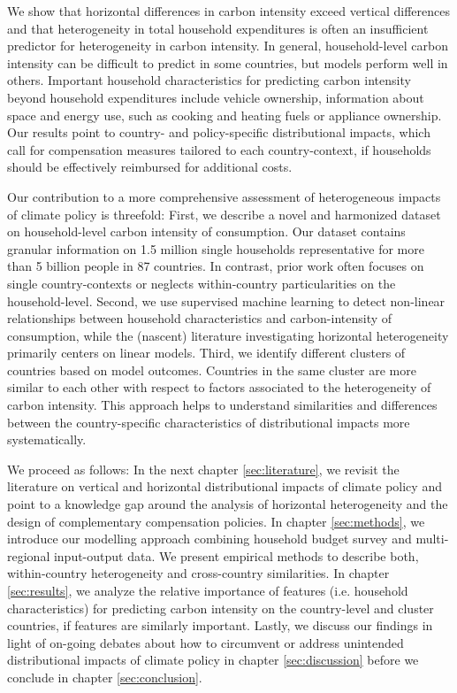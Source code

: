 \documentclass[12pt, a4paper]{article}
\begin{document}
We show that horizontal differences in carbon intensity exceed vertical differences and that heterogeneity in total household expenditures is often an insufficient predictor for heterogeneity in carbon intensity. In general, household-level carbon intensity can be difficult to predict in some countries, but models perform well in others. Important household characteristics for predicting carbon intensity beyond household expenditures include vehicle ownership, information about space and energy use, such as cooking and heating fuels or appliance ownership. Our results point to country- and policy-specific distributional impacts, which call for compensation measures tailored to each country-context, if households should be effectively reimbursed for additional costs. 

Our contribution to a more comprehensive assessment of heterogeneous impacts of climate policy is threefold: First, we describe a novel and harmonized dataset on household-level carbon intensity of consumption. Our dataset contains granular information on 1.5 million single households representative for more than 5 billion people in 87 countries. In contrast, prior work often focuses on single country-contexts or neglects within-country particularities on the household-level. Second, we use supervised machine learning to detect non-linear relationships between household characteristics and carbon-intensity of consumption, while the (nascent) literature investigating horizontal heterogeneity primarily centers on linear models. Third, we identify different clusters of countries based on model outcomes. Countries in the same cluster are more similar to each other with respect to factors associated to the heterogeneity of carbon intensity. This approach helps to understand similarities and differences between the country-specific characteristics of distributional impacts more systematically. %

We proceed as follows: In the next chapter \ref{sec:literature}, we revisit the literature on vertical and horizontal distributional impacts of climate policy and point to a knowledge gap around the analysis of horizontal heterogeneity and the design of complementary compensation policies. In chapter \ref{sec:methods}, we introduce our modelling approach combining household budget survey and multi-regional input-output data. We present empirical methods to describe both, within-country heterogeneity and cross-country similarities. In chapter \ref{sec:results}, we analyze the relative importance of features (i.e. household characteristics) for predicting carbon intensity on the country-level and cluster countries, if features are similarly important. Lastly, we discuss our findings in light of on-going debates about how to circumvent or address unintended distributional impacts of climate policy in chapter \ref{sec:discussion} before we conclude in chapter \ref{sec:conclusion}.  
\end{document}
